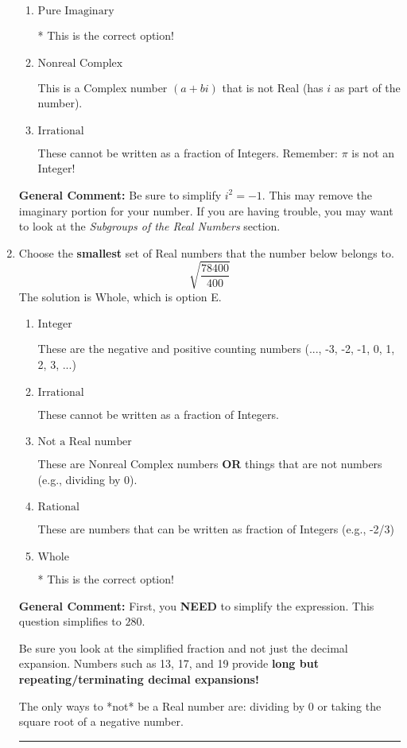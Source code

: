 \documentclass{extbook}[14pt]
\newcommand{\litem}[1]{\item #1

\rule{\textwidth}{0.4pt}}
\begin{document}
\begin{enumerate}
{\begin{enumerate}[label=\Alph*.]
These are numbers that can be written as fraction of Integers (e.g., -2/3 + 5)
\item \( \text{Pure Imaginary} \)

* This is the correct option!
\item \( \text{Nonreal Complex} \)

This is a Complex number $(a+bi)$ that is not Real (has $i$ as part of the number).
\item \( \text{Irrational} \)

These cannot be written as a fraction of Integers. Remember: $\pi$ is not an Integer!
\end{enumerate}

\textbf{General Comment:} Be sure to simplify $i^2 = -1$. This may remove the imaginary portion for your number. If you are having trouble, you may want to look at the \textit{Subgroups of the Real Numbers} section.
}
\litem{
Choose the \textbf{smallest} set of Real numbers that the number below belongs to.
\[ \sqrt{\frac{78400}{400}} \]The solution is \( \text{Whole} \), which is option E.\begin{enumerate}[label=\Alph*.]
\item \( \text{Integer} \)

These are the negative and positive counting numbers (..., -3, -2, -1, 0, 1, 2, 3, ...)
\item \( \text{Irrational} \)

These cannot be written as a fraction of Integers.
\item \( \text{Not a Real number} \)

These are Nonreal Complex numbers \textbf{OR} things that are not numbers (e.g., dividing by 0).
\item \( \text{Rational} \)

These are numbers that can be written as fraction of Integers (e.g., -2/3)
\item \( \text{Whole} \)

* This is the correct option!
\end{enumerate}

\textbf{General Comment:} First, you \textbf{NEED} to simplify the expression. This question simplifies to $280$. 
 
 Be sure you look at the simplified fraction and not just the decimal expansion. Numbers such as 13, 17, and 19 provide \textbf{long but repeating/terminating decimal expansions!} 
 
 The only ways to *not* be a Real number are: dividing by 0 or taking the square root of a negative number. 
 
}
\end{enumerate}
\end{document}
